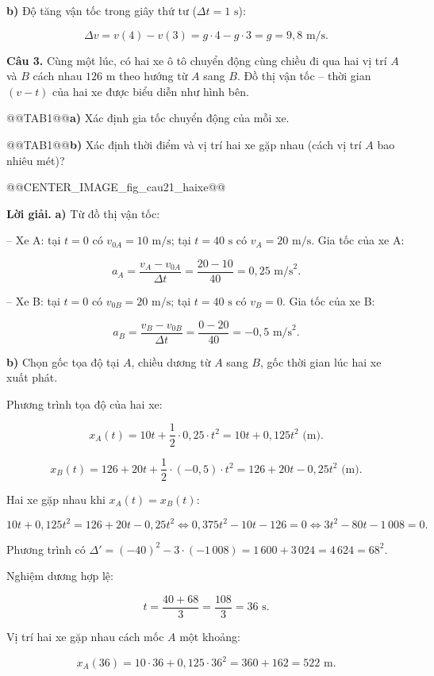 \documentclass{article}
\begin{document}
\textbf{b)} Độ tăng vận tốc trong giây thứ tư ($\Delta t = 1\text{ s}$):

\[\Delta v = v(4) - v(3) = g \cdot 4 - g \cdot 3 = g = 9{,}8\text{ m/s}.\]

\textbf{Câu 3.} Cùng một lúc, có hai xe ô tô chuyển động cùng chiều đi qua hai vị trí $A$ và $B$ cách nhau $126\text{ m}$ theo hướng từ $A$ sang $B$. Đồ thị vận tốc -- thời gian $(v - t)$ của hai xe được biểu diễn như hình bên.

@@TAB1@@\textbf{a)} Xác định gia tốc chuyển động của mỗi xe.

@@TAB1@@\textbf{b)} Xác định thời điểm và vị trí hai xe gặp nhau (cách vị trí $A$ bao nhiêu mét)?

@@CENTER_IMAGE_fig_cau21_haixe@@

\textbf{Lời giải.} \textbf{a)} Từ đồ thị vận tốc:

-- Xe A: tại $t = 0$ có $v_{0A} = 10\text{ m/s}$; tại $t = 40\text{ s}$ có $v_A = 20\text{ m/s}$. Gia tốc của xe A:

\[a_A = \frac{v_A - v_{0A}}{\Delta t} = \frac{20 - 10}{40} = 0{,}25\text{ m/s}^2.\]

-- Xe B: tại $t = 0$ có $v_{0B} = 20\text{ m/s}$; tại $t = 40\text{ s}$ có $v_B = 0$. Gia tốc của xe B:

\[a_B = \frac{v_B - v_{0B}}{\Delta t} = \frac{0 - 20}{40} = -0{,}5\text{ m/s}^2.\]

\textbf{b)} Chọn gốc tọa độ tại $A$, chiều dương từ $A$ sang $B$, gốc thời gian lúc hai xe xuất phát.

Phương trình tọa độ của hai xe:

\[x_A(t) = 10t + \frac{1}{2} \cdot 0{,}25 \cdot t^2 = 10t + 0{,}125t^2\text{ (m)}.\]

\[x_B(t) = 126 + 20t + \frac{1}{2} \cdot (-0{,}5) \cdot t^2 = 126 + 20t - 0{,}25t^2\text{ (m)}.\]

Hai xe gặp nhau khi $x_A(t) = x_B(t)$:

\[10t + 0{,}125t^2 = 126 + 20t - 0{,}25t^2 \Leftrightarrow 0{,}375t^2 - 10t - 126 = 0 \Leftrightarrow 3t^2 - 80t - 1\,008 = 0.\]

Phương trình có $\Delta' = (-40)^2 - 3 \cdot (-1\,008) = 1\,600 + 3\,024 = 4\,624 = 68^2$.

Nghiệm dương hợp lệ:

\[t = \frac{40 + 68}{3} = \frac{108}{3} = 36\text{ s}.\]

Vị trí hai xe gặp nhau cách mốc $A$ một khoảng:

\[x_A(36) = 10 \cdot 36 + 0{,}125 \cdot 36^2 = 360 + 162 = 522\text{ m}.\]
\end{document}
